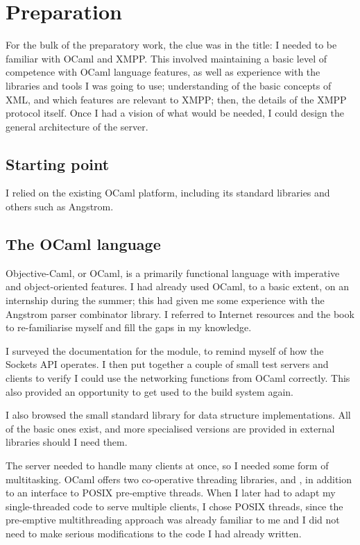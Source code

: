 \documentclass[12pt,a4paper,twoside,openright]{report}
\begin{document}
{\chapter{Preparation}
For the bulk of the preparatory work, the clue was in the title: I needed to be familiar with OCaml and XMPP. This involved maintaining a basic level of competence with OCaml language features, as well as experience with the libraries and tools I was going to use; understanding of the basic concepts of XML, and which features are relevant to XMPP; then, the details of the XMPP protocol itself. Once I had a vision of what would be needed, I could design the general architecture of the server.

\section{Starting point}
I relied on the existing OCaml platform, including its standard libraries and others such as Angstrom.

\section{The OCaml language}
Objective-Caml, or OCaml, is a primarily functional language with imperative and object-oriented features. I had already used OCaml, to a basic extent, on an internship during the summer; this had given me some experience with the Angstrom parser combinator library. I referred to Internet resources and the  book to re-familiarise myself and fill the gaps in my knowledge.

I surveyed the documentation for the  module, to remind myself of how the Sockets API operates. I then put together a couple of small test servers and clients to verify I could use the networking functions from OCaml correctly. This also provided an opportunity to get used to the build system again.

I also browsed the small standard library for data structure implementations. All of the basic ones exist, and more specialised versions are provided in external libraries should I need them.

The server needed to handle many clients at once, so I needed some form of multitasking. OCaml offers two co-operative threading libraries,  and , in addition to an interface to POSIX pre-emptive threads. When I later had to adapt my single-threaded code to serve multiple clients, I chose POSIX threads, since the pre-emptive multithreading approach was already familiar to me and I did not need to make serious modifications to the code I had already written.

}
\end{document}

